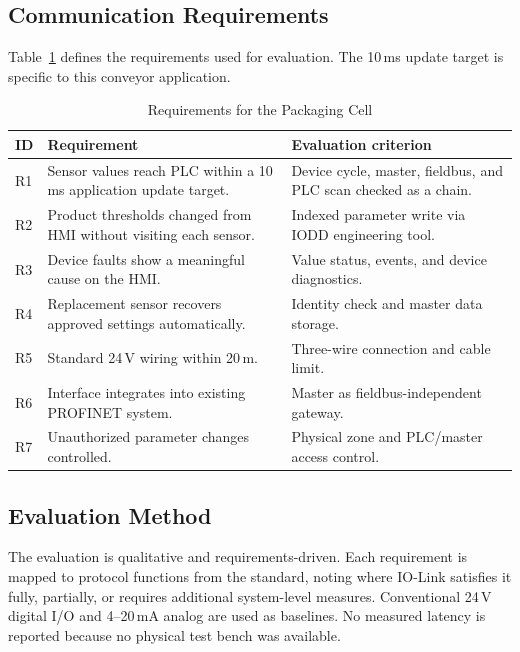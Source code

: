 \documentclass[conference]{IEEEtran}
\begin{document}
\subsection{Communication Requirements}

Table~\ref{tab:req} defines the requirements used for evaluation. The
10\,ms update target is specific to this conveyor application.

\begin{table}[!t]
\caption{Requirements for the Packaging Cell}
\label{tab:req}
\renewcommand{\arraystretch}{1.25}
\begin{tabularx}{\columnwidth}{@{}p{0.5cm} p{3.15cm} p{3.05cm}@{}}
\toprule
\textbf{ID} & \textbf{Requirement} & \textbf{Evaluation criterion} \\
\midrule
R1 & Sensor values reach PLC within a 10\,ms application update target. &
     Device cycle, master, fieldbus, and PLC scan checked as a chain. \\[2pt]
R2 & Product thresholds changed from HMI without visiting each sensor. &
     Indexed parameter write via IODD engineering tool. \\[2pt]
R3 & Device faults show a meaningful cause on the HMI. &
     Value status, events, and device diagnostics. \\[2pt]
R4 & Replacement sensor recovers approved settings automatically. &
     Identity check and master data storage. \\[2pt]
R5 & Standard 24\,V wiring within 20\,m. &
     Three-wire connection and cable limit. \\[2pt]
R6 & Interface integrates into existing PROFINET system. &
     Master as fieldbus-independent gateway. \\[2pt]
R7 & Unauthorized parameter changes controlled. &
     Physical zone and PLC/master access control. \\
\bottomrule
\end{tabularx}
\end{table}

\subsection{Evaluation Method}

The evaluation is qualitative and requirements-driven. Each requirement
is mapped to protocol functions from the standard, noting where IO-Link
satisfies it fully, partially, or requires additional system-level
measures. Conventional 24\,V digital I/O and 4--20\,mA analog are used
as baselines. No measured latency is reported because no physical test
bench was available.
\end{document}
